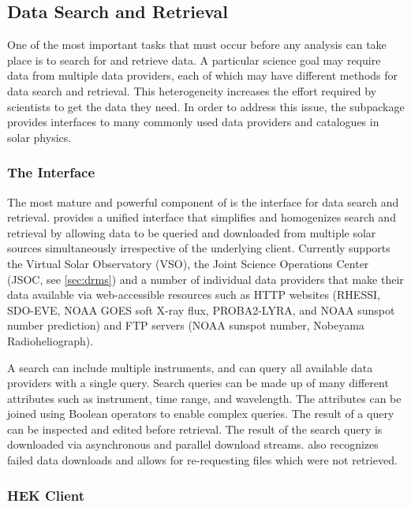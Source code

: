 
\subsection{Data Search and Retrieval}
\label{sec:fido}

One of the most important tasks that must occur before any analysis can take place is to search for and retrieve data.
A particular science goal may require data from multiple data providers, each of which may have different methods for data search and retrieval.
This heterogeneity increases the effort required by scientists to get the data they need.
In order to address this issue, the  subpackage provides interfaces to many commonly used data providers and catalogues in solar physics.

\subsubsection{The \Fido Interface}
\label{sec:fido}

The most mature and powerful component of  is the \Fido interface for data search and retrieval.
\Fido provides a unified interface that simplifies and homogenizes search and retrieval by allowing data to be queried and downloaded from multiple solar sources simultaneously irrespective of the underlying client.
Currently \Fido supports the Virtual Solar Observatory (VSO), the Joint Science Operations Center (JSOC, see \autoref{sec:drms}) and a number of individual data providers that make their data available via web-accessible resources such as HTTP websites (RHESSI, SDO-EVE, NOAA GOES soft X-ray flux, PROBA2-LYRA, and NOAA sunspot number prediction) and FTP servers (NOAA sunspot number, Nobeyama Radioheliograph).

A \Fido search can include multiple instruments, and can query all available data providers with a single query.
Search queries can be made up of many different attributes such as instrument, time range, and wavelength.
The attributes can be joined using Boolean operators to enable complex queries.
The result of a query can be inspected and edited before retrieval.
The result of the \Fido search query is downloaded via asynchronous and parallel download streams.
\Fido also recognizes failed data downloads and allows for re-requesting files which were not retrieved.

\subsubsection{HEK Client}
\label{sec:hek}


